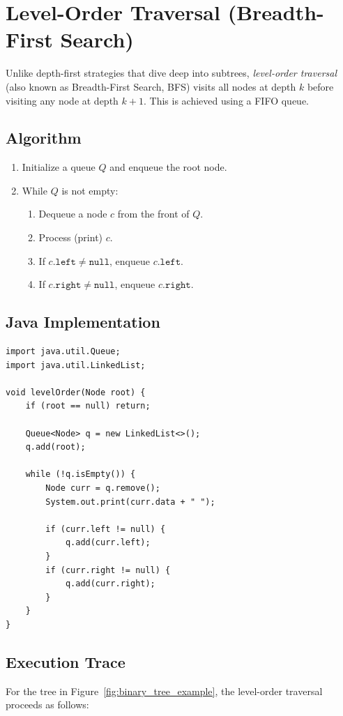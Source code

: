 \documentclass[10pt,journal,compsoc,onecolumn]{IEEEtran}
\begin{document}
\section{Level-Order Traversal (Breadth-First Search)}
\label{sec:level_order}

Unlike depth-first strategies that dive deep into subtrees, \emph{level-order traversal} (also known as Breadth-First Search, BFS) visits all nodes at depth $k$ before visiting any node at depth $k+1$. This is achieved using a FIFO queue.

\subsection{Algorithm}
\begin{enumerate}
    \item Initialize a queue $Q$ and enqueue the root node.
    \item While $Q$ is not empty:
    \begin{enumerate}
        \item Dequeue a node $c$ from the front of $Q$.
        \item Process (print) $c$.
        \item If $c.\texttt{left} \neq \texttt{null}$, enqueue $c.\texttt{left}$.
        \item If $c.\texttt{right} \neq \texttt{null}$, enqueue $c.\texttt{right}$.
    \end{enumerate}
\end{enumerate}

\subsection{Java Implementation}
\begin{verbatim}
import java.util.Queue;
import java.util.LinkedList;

void levelOrder(Node root) {
    if (root == null) return;

    Queue<Node> q = new LinkedList<>();
    q.add(root);

    while (!q.isEmpty()) {
        Node curr = q.remove();
        System.out.print(curr.data + " ");

        if (curr.left != null) {
            q.add(curr.left);
        }
        if (curr.right != null) {
            q.add(curr.right);
        }
    }
}
\end{verbatim}

\subsection{Execution Trace}
For the tree in Figure~\ref{fig:binary_tree_example}, the level-order traversal proceeds as follows:
\end{document}
